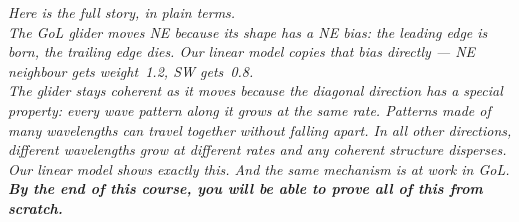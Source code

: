 \documentclass[11pt]{article}
\begin{document}
\bigskip\noindent
\begin{center}
\colorbox{gray!10}{\parbox{0.88\textwidth}{
\itshape
Here is the full story, in plain terms.\\[6pt]
The GoL glider moves NE because its shape has a NE bias: the leading edge
is born, the trailing edge dies.
Our linear model copies that bias directly — NE neighbour gets weight~1.2,
SW gets~0.8.\\[6pt]
The glider \emph{stays coherent} as it moves because the diagonal direction
has a special property: every wave pattern along it grows at the same rate.
Patterns made of many wavelengths can travel together without falling apart.
In all other directions, different wavelengths grow at different rates and
any coherent structure disperses.\\[6pt]
Our linear model shows exactly this.
And the same mechanism is at work in GoL.\\[6pt]
\textbf{By the end of this course, you will be able to prove all of this from scratch.}
}}
\end{center}

\bigskip
\end{document}
